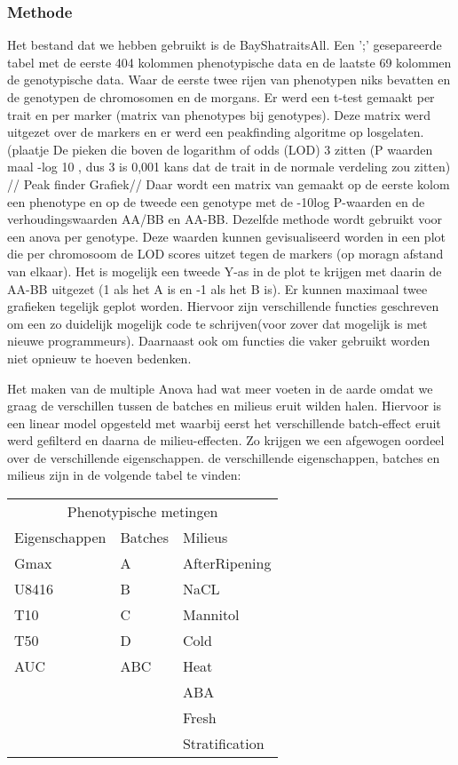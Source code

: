 \documentclass[12pt,a4paper, twocolumn]{article}
\begin{document}
\subsubsection*{Methode}
Het bestand dat we hebben gebruikt is de BayShatraitsAll. 
Een ';' gesepareerde tabel met de eerste 404 kolommen phenotypische data en de laatste 69 kolommen de genotypische data.
Waar de eerste twee rijen van phenotypen niks bevatten en de genotypen de chromosomen en de morgans.
Er werd een t-test gemaakt per trait en per marker (matrix van phenotypes bij genotypes).
Deze matrix werd uitgezet over de markers en er werd een peakfinding algoritme op losgelaten. (plaatje
De pieken die boven de logarithm of odds (LOD) 3 zitten (P waarden maal -log 10 , dus 3 is 0,001 kans dat de trait in de normale verdeling zou zitten) //
Peak finder Grafiek//
Daar wordt een matrix van gemaakt op de eerste kolom een phenotype en op de tweede een genotype met de -10log P-waarden en de  verhoudingswaarden AA/BB en AA-BB.
Dezelfde methode wordt gebruikt voor een anova per genotype. 
Deze waarden kunnen gevisualiseerd worden in een plot die per chromosoom de LOD scores uitzet tegen de markers (op moragn afstand van elkaar).
Het is mogelijk een tweede Y-as in de plot te krijgen met daarin de AA-BB uitgezet (1 als het A is en -1 als het B is).
Er kunnen maximaal twee grafieken tegelijk geplot worden.
Hiervoor zijn verschillende functies geschreven om een zo duidelijk mogelijk code te schrijven(voor zover dat mogelijk is met nieuwe programmeurs).
Daarnaast ook om functies die vaker gebruikt worden niet opnieuw te hoeven bedenken.

Het maken van de multiple Anova had wat meer voeten in de aarde omdat we graag de verschillen tussen de batches en milieus eruit wilden halen.
Hiervoor is een linear model opgesteld met waarbij eerst het verschillende batch-effect eruit werd gefilterd en daarna de milieu-effecten.
Zo krijgen we een afgewogen oordeel over de verschillende eigenschappen.
de verschillende eigenschappen, batches en milieus zijn in de volgende tabel te vinden:\\

\begin{tabular} {l  l  l}
\multicolumn{3}{c}{Phenotypische metingen} \\
Eigenschappen & Batches & Milieus\\ 
\hline 
Gmax & A & AfterRipening\\
U8416 & B & NaCL\\
T10 & C & Mannitol\\
T50 & D & Cold\\
AUC & ABC & Heat\\
 &  & ABA\\
 &  & Fresh\\
 &  & Stratification\\
\end{tabular}\\
\end{document}
